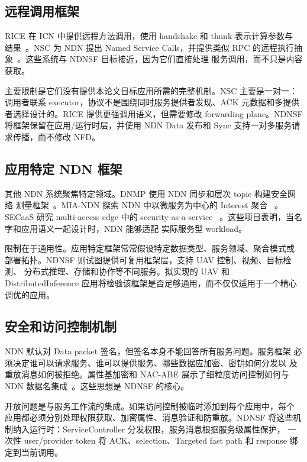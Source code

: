 \subsection{远程调用框架}

RICE 在 ICN 中提供远程方法调用，使用 handshake 和 thunk 表示计算参数与
结果~\cite{rice}。NSC 为 NDN 提出 Named Service Calls，并提供类似 RPC
的远程执行抽象~\cite{nsc}。这些系统与 NDNSF 目标接近，因为它们直接处理
服务调用，而不只是内容获取。

主要限制是它们没有提供本论文目标应用所需的完整机制。NSC 主要是一对一：
调用者联系 executor，协议不是围绕同时服务提供者发现、ACK 元数据和多提供
者选择设计的。RICE 提供更强调用语义，但需要修改 forwarding plane。NDNSF
将框架保留在应用/运行时层，并使用 NDN Data 发布和 Sync 支持一对多服务请
求传播，而不修改 NFD。

\subsection{应用特定 NDN 框架}

其他 NDN 系统聚焦特定领域。DNMP 使用 NDN 同步和层次 topic 构建安全网络
测量框架~\cite{dnmp}。MIA-NDN 探索 NDN 中以微服务为中心的 Interest 聚合
~\cite{miandn}。SECaaS 研究 multi-access edge 中的 security-as-a-service
~\cite{secaas}。这些项目表明，当名字和应用语义一起设计时，NDN 能够适配
实际服务型 workload。

限制在于通用性。应用特定框架常常假设特定数据类型、服务领域、聚合模式或
部署拓扑。NDNSF 则试图提供可复用框架层，支持 UAV 控制、视频、目标检测、
分布式推理、存储和协作等不同服务。拟实现的 UAV 和 DistributedInference
应用将检验该框架是否足够通用，而不仅仅适用于一个精心调优的应用。

\subsection{安全和访问控制机制}

NDN 默认对 Data packet 签名，但签名本身不能回答所有服务问题。服务框架
必须决定谁可以请求服务、谁可以提供服务、哪些数据应加密、密钥如何分发以
及重放消息如何被拒绝。属性基加密和 NAC-ABE 展示了细粒度访问控制如何与
NDN 数据名集成~\cite{goyal2006abe,dulal2023nacabe}。这些思想是 NDNSF 的核心。

开放问题是与服务工作流的集成。如果访问控制被临时添加到每个应用中，每个
应用都必须分别处理权限获取、加密属性、消息验证和防重放。NDNSF 将这些机
制纳入运行时：ServiceController 分发权限，服务消息根据服务级属性保护，
一次性 user/provider token 将 ACK、selection、Targeted fast path 和
response 绑定到当前调用。

